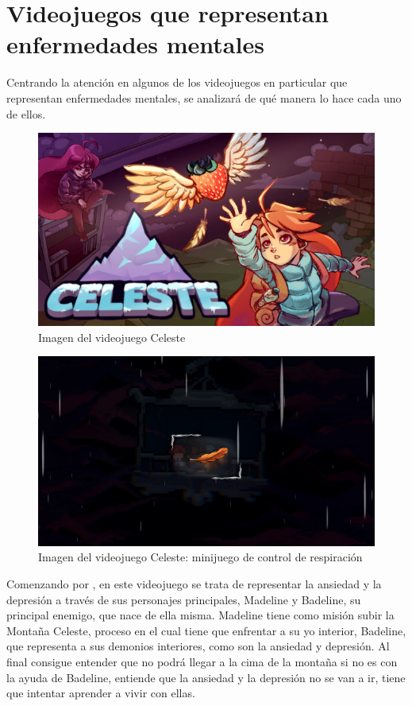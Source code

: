\documentclass[12pt, a4paper,twoside,titlepage]{book}
\begin{document}
\section{Videojuegos que representan enfermedades mentales}
\label{sec:videojuegosEnf}

Centrando la atención en algunos de los videojuegos en particular que representan enfermedades mentales, se analizará de qué manera lo hace cada uno de ellos.


\begin{figure}
  \centering
    \includegraphics[width=.8\linewidth]{Imagenes videojuegos/Celeste.jpg}
    \caption{Imagen del videojuego Celeste}
    \label{img:featherCelesteA}
\end{figure}

\begin{figure}
  \centering
    \includegraphics[width=.8\linewidth]{Imagenes videojuegos/featherceleste}
    \caption{Imagen del videojuego Celeste: minijuego de control de respiración}
    \label{img:featherCelesteB}
\end{figure}

Comenzando por ,  en este videojuego se trata de representar la ansiedad y la depresión a través de sus personajes principales, Madeline y Badeline, su principal enemigo, que nace de ella misma. Madeline tiene como misión subir la Montaña Celeste, proceso en el cual tiene que enfrentar a su yo interior, Badeline, que representa a sus demonios interiores, como son la ansiedad y depresión. Al final consigue entender que no podrá llegar a la cima de la montaña si no es con la ayuda de Badeline, entiende que la ansiedad y la depresión no se van a ir, tiene que intentar aprender a vivir con ellas. 
\end{document}
